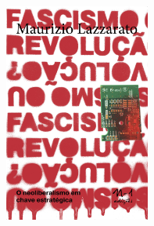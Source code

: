 \pagebreak

\hspace{.5cm}

\begin{center}
\hspace*{-.5cm}\includegraphics[width=48mm]{./imgs/lazzarato.jpg}
\end{center}

\hspace*{-7cm}\hrulefill\hspace*{-7cm}

\medskip

